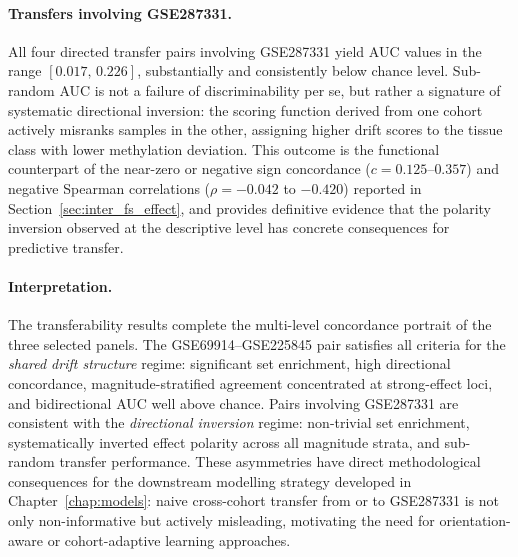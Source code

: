 \paragraph{Transfers involving GSE287331.}
All four directed transfer pairs involving GSE287331 yield AUC values
in the range $[0.017,\, 0.226]$, substantially and consistently below
chance level.
Sub-random AUC is not a failure of discriminability per se, but rather
a signature of systematic directional inversion: the scoring function
derived from one cohort actively misranks samples in the other,
assigning higher drift scores to the tissue class with lower methylation
deviation.
This outcome is the functional counterpart of the near-zero or negative
sign concordance ($c = 0.125$--$0.357$) and negative Spearman correlations
($\rho = -0.042$ to $-0.420$) reported in Section~\ref{sec:inter_fs_effect},
and provides definitive evidence that the polarity inversion observed at
the descriptive level has concrete consequences for predictive transfer.

\paragraph{Interpretation.}
The transferability results complete the multi-level concordance portrait
of the three selected panels.
The GSE69914--GSE225845 pair satisfies all criteria for the
\emph{shared drift structure} regime: significant set enrichment,
high directional concordance, magnitude-stratified agreement concentrated
at strong-effect loci, and bidirectional AUC well above chance.
Pairs involving GSE287331 are consistent with the
\emph{directional inversion} regime: non-trivial set enrichment,
systematically inverted effect polarity across all magnitude strata,
and sub-random transfer performance.
These asymmetries have direct methodological consequences for the
downstream modelling strategy developed in Chapter~\ref{chap:models}:
naive cross-cohort transfer from or to GSE287331 is not only
non-informative but actively misleading, motivating the need for
orientation-aware or cohort-adaptive learning approaches.

